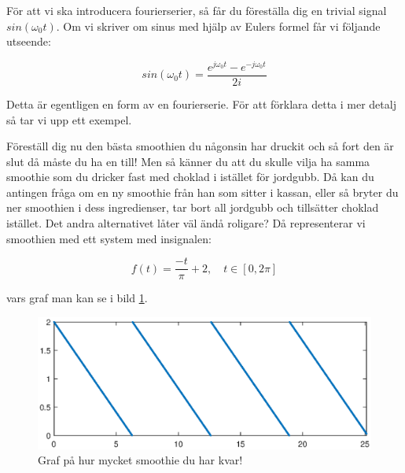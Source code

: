 \documentclass{article}
\begin{document}
För att vi ska introducera fourierserier, så får du föreställa dig en
trivial signal $sin(\omega_0 t)$.
Om vi skriver om sinus med hjälp av Eulers formel får vi följande utseende:

\begin{displaymath}
  sin(\omega_0 t) = \frac{e^{j \omega_0 t}  - e^{-j \omega_0 t}}{2i}
\end{displaymath}

Detta är egentligen en form av en fourierserie.
För att förklara detta i mer detalj så tar vi upp ett exempel.

Föreställ dig nu den bästa smoothien du någonsin har druckit och så fort den är
slut då måste du ha en till! Men så känner du att du skulle vilja ha samma
smoothie som du dricker fast med choklad i istället för jordgubb.
Då kan du antingen fråga om en ny smoothie från han som sitter i kassan,
eller så bryter du ner smoothien i dess ingredienser, tar bort all jordgubb
och tillsätter choklad istället. Det andra alternativet låter väl ändå roligare?
Då representerar vi smoothien med ett system med insignalen:

\begin{displaymath}
  f(t) = \frac{-t}{\pi} + 2, \quad t \in [0,2 \pi]
\end{displaymath}

vars graf man kan se i bild \ref{fig:smoothie}.

\begin{figure}[ht]
\centerline{\includegraphics[scale=0.55]{smoothie.eps}}
\caption{Graf på hur mycket smoothie du har kvar!}
\label{fig:smoothie}
\end{figure}
\end{document}
